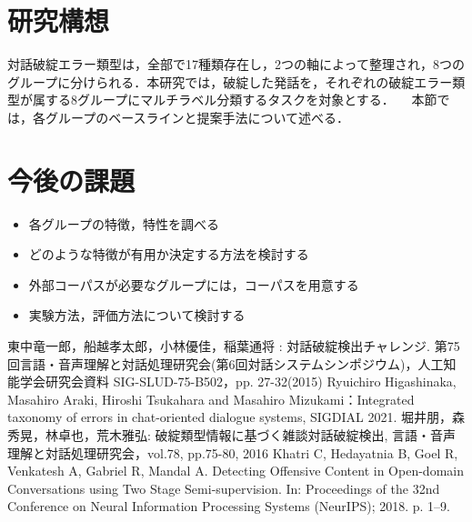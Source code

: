 \documentclass[upLaTex, 10pt,dvipdfmx,a4paper,twocolumn]{jsarticle}
\begin{document}
\section{研究構想}
    対話破綻エラー類型は，全部で17種類存在し，2つの軸によって整理され，8つのグループに分けられる．本研究では，破綻した発話を，それぞれの破綻エラー類型が属する8グループにマルチラベル分類するタスクを対象とする．
    　本節では，各グループのベースラインと提案手法について述べる．

\section{今後の課題}
 \begin{itemize}
     \item 各グループの特徴，特性を調べる
     \item どのような特徴が有用か決定する方法を検討する
     \item 外部コーパスが必要なグループには，コーパスを用意する
     \item 実験方法，評価方法について検討する
 \end{itemize} 

 
 
\begin{thebibliography}{99}
     東中竜一郎，船越孝太郎，小林優佳，稲葉通将 : 対話破綻検出チャレンジ. 第75回言語・音声理解と対話処理研究会(第6回対話システムシンポジウム)，人工知能学会研究会資料 SIG-SLUD-75-B502，pp. 27-32(2015)
     Ryuichiro Higashinaka, Masahiro Araki, Hiroshi Tsukahara and Masahiro Mizukami：Integrated taxonomy of errors in chat-oriented dialogue systems,  SIGDIAL 2021.
     堀井朋，森秀晃，林卓也，荒木雅弘: 破綻類型情報に基づく雑談対話破綻検出, 言語・音声理解と対話処理研究会，vol.78, pp.75-80, 2016
    Khatri C, Hedayatnia B, Goel R, Venkatesh A, Gabriel R, Mandal A. Detecting Offensive Content in Open-domain Conversations using Two Stage Semi-supervision. In: Proceedings of the 32nd Conference on Neural Information Processing Systems (NeurIPS); 2018. p. 1–9. 

\end{thebibliography}
\end{document}
